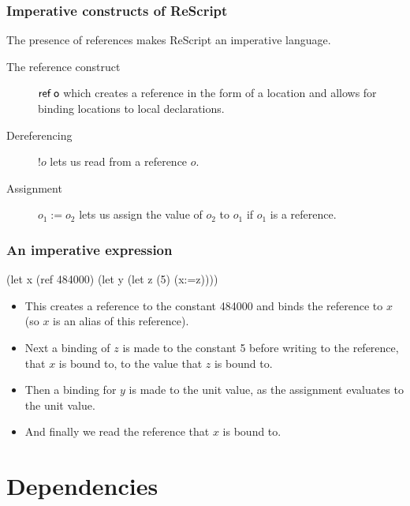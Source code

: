 \documentclass{beamer}
\begin{document}
\begin{frame}
  \frametitle{Imperative constructs of ReScript}
  
  The presence of references makes ReScript an imperative language.

  \begin{description}
    \item[The reference construct] $\textsf{ref\;o}$ which creates a reference in the form of a location and allows for binding locations to local declarations.

    \item[Dereferencing] $!o$ lets us read from a reference $o$.

    \item[Assignment] $o_1 := o_2$ lets us assign the value of $o_2$
      to $o_1$ if $o_1$ is a reference.
\end{description}


\end{frame}



\begin{frame}[fragile]
  \frametitle{An imperative expression}
  
\begin{rescript}
       (let x (ref 484000)
        (let y (let z (5) (x:=z))))
\end{rescript}

\begin{itemize}
\item<1->This creates a reference to the constant 484000 and binds the reference to
  $x$ (so $x$ is an alias of this reference).
\item<2-> Next a binding of $z$ is made
to the constant 5 before writing to the reference, that $x$ is bound to, 
to the value that $z$ is bound to.
\item<3-> Then a binding for $y$ is made to the unit value,
  as the assignment evaluates to the unit value.
\item<4-> And finally we read the reference that $x$ is bound to.
\end{itemize}

\end{frame}

\section{Dependencies}
\end{document}
